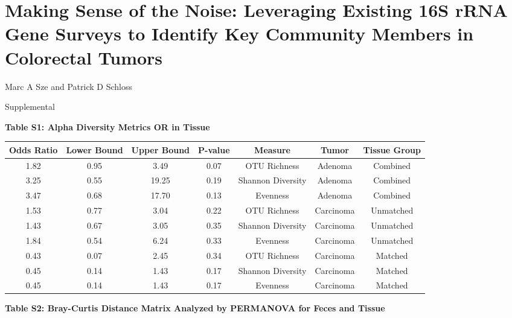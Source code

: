 \documentclass[12pt,]{article}
\title{}
\author{}
\date{}
\begin{document}
\section{Making Sense of the Noise: Leveraging Existing 16S rRNA Gene
Surveys to Identify Key Community Members in Colorectal
Tumors}\label{making-sense-of-the-noise-leveraging-existing-16s-rrna-gene-surveys-to-identify-key-community-members-in-colorectal-tumors}

\vspace{10mm}

\begin{center}
Marc A Sze and Patrick D Schloss

\vspace{10mm}

Supplemental
\end{center}

\newpage

\textbf{Table S1: Alpha Diversity Metrics OR in Tissue}

\footnotesize

\begin{longtable}[]{@{}ccccccc@{}}
\toprule
Odds Ratio & Lower Bound & Upper Bound & P-value & Measure & Tumor &
Tissue Group\tabularnewline
\midrule
\endhead
1.82 & 0.95 & 3.49 & 0.07 & OTU Richness & Adenoma &
Combined\tabularnewline
3.25 & 0.55 & 19.25 & 0.19 & Shannon Diversity & Adenoma &
Combined\tabularnewline
3.47 & 0.68 & 17.70 & 0.13 & Evenness & Adenoma &
Combined\tabularnewline
1.53 & 0.77 & 3.04 & 0.22 & OTU Richness & Carcinoma &
Unmatched\tabularnewline
1.43 & 0.67 & 3.05 & 0.35 & Shannon Diversity & Carcinoma &
Unmatched\tabularnewline
1.84 & 0.54 & 6.24 & 0.33 & Evenness & Carcinoma &
Unmatched\tabularnewline
0.43 & 0.07 & 2.45 & 0.34 & OTU Richness & Carcinoma &
Matched\tabularnewline
0.45 & 0.14 & 1.43 & 0.17 & Shannon Diversity & Carcinoma &
Matched\tabularnewline
0.45 & 0.14 & 1.43 & 0.17 & Evenness & Carcinoma &
Matched\tabularnewline
\bottomrule
\end{longtable}

\normalsize

\newpage

\textbf{Table S2: Bray-Curtis Distance Matrix Analyzed by PERMANOVA for
Feces and Tissue}
\end{document}
